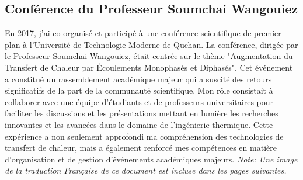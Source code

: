 \documentclass{article}
\begin{document}
    \subsection{Conférence du Professeur Soumchai Wangouiez}
    En 2017, j'ai co-organisé et participé à une conférence scientifique de premier plan à l'Université de Technologie Moderne de Quchan. La conférence, dirigée par le Professeur Soumchai Wangouiez, était centrée sur le thème "Augmentation du Transfert de Chaleur par Écoulements Monophasés et Diphasés". Cet événement a constitué un rassemblement académique majeur qui a suscité des retours significatifs de la part de la communauté scientifique. Mon rôle consistait à collaborer avec une équipe d'étudiants et de professeurs universitaires pour faciliter les discussions et les présentations mettant en lumière les recherches innovantes et les avancées dans le domaine de l'ingénierie thermique. Cette expérience a non seulement approfondi ma compréhension des technologies de transfert de chaleur, mais a également renforcé mes compétences en matière d'organisation et de gestion d'événements académiques majeurs.
    \newline
    \newline
    \textit {Note: Une image de la traduction Française de ce document est incluse dans les pages suivantes.}
    \newpage
    
\end{document}
